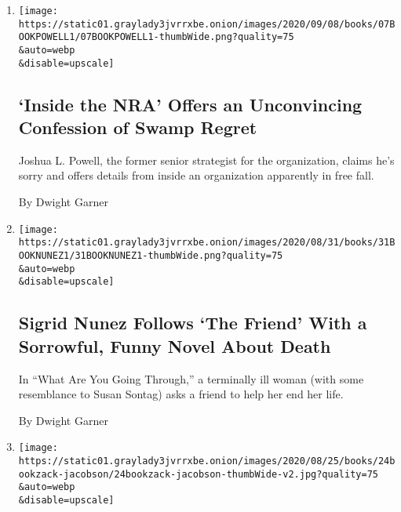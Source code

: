 \begin{enumerate}
\def\labelenumi{\arabic{enumi}.}
\item
  \href{/2020/09/07/books/review-inside-nra-joshua-powell.html}{}

  \texttt{[image: https://static01.graylady3jvrrxbe.onion/images/2020/09/08/books/07BOOKPOWELL1/07BOOKPOWELL1-thumbWide.png?quality=75\\\&auto=webp\\\&disable=upscale]}

  \hypertarget{inside-the-nra-offers-an-unconvincing-confession-of-swamp-regret}{%
  \subsection{`Inside the NRA' Offers an Unconvincing Confession of
  Swamp
  Regret}\label{inside-the-nra-offers-an-unconvincing-confession-of-swamp-regret}}

  Joshua L. Powell, the former senior strategist for the organization,
  claims he's sorry and offers details from inside an organization
  apparently in free fall.

  By Dwight Garner
\item
  \href{/2020/08/31/books/review-what-are-you-going-through-sigrid-nunez.html}{}

  \texttt{[image: https://static01.graylady3jvrrxbe.onion/images/2020/08/31/books/31BOOKNUNEZ1/31BOOKNUNEZ1-thumbWide.png?quality=75\\\&auto=webp\\\&disable=upscale]}

  \hypertarget{sigrid-nunez-follows-the-friend-with-a-sorrowful-funny-novel-about-death}{%
  \subsection{Sigrid Nunez Follows `The Friend' With a Sorrowful, Funny
  Novel About
  Death}\label{sigrid-nunez-follows-the-friend-with-a-sorrowful-funny-novel-about-death}}

  In ``What Are You Going Through,'' a terminally ill woman (with some
  resemblance to Susan Sontag) asks a friend to help her end her life.

  By Dwight Garner
\item
  \href{/2020/08/24/books/review-odetta-biography-ian-zack-one-grain-of-sand-matthew-frye-jacobson.html}{}

  \texttt{[image: https://static01.graylady3jvrrxbe.onion/images/2020/08/25/books/24bookzack-jacobson/24bookzack-jacobson-thumbWide-v2.jpg?quality=75\\\&auto=webp\\\&disable=upscale]}

  \hypertarget{remembering-odetta-whose-powerful-voice-met-a-profound-moment}{%
}
\end{enumerate}
